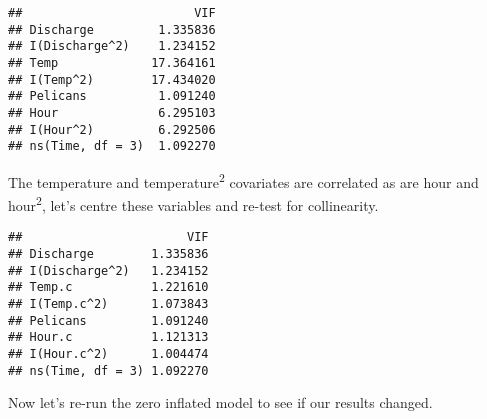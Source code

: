 \documentclass[]{article}
\begin{document}
\begin{verbatim}
##                        VIF
## Discharge         1.335836
## I(Discharge^2)    1.234152
## Temp             17.364161
## I(Temp^2)        17.434020
## Pelicans          1.091240
## Hour              6.295103
## I(Hour^2)         6.292506
## ns(Time, df = 3)  1.092270
\end{verbatim}

The temperature and temperature\textsuperscript{2} covariates are
correlated as are hour and hour\textsuperscript{2}, let's centre these
variables and re-test for collinearity.

\begin{verbatim}
##                       VIF
## Discharge        1.335836
## I(Discharge^2)   1.234152
## Temp.c           1.221610
## I(Temp.c^2)      1.073843
## Pelicans         1.091240
## Hour.c           1.121313
## I(Hour.c^2)      1.004474
## ns(Time, df = 3) 1.092270
\end{verbatim}

Now let's re-run the zero inflated model to see if our results changed.
\end{document}
